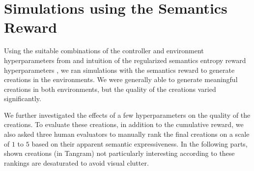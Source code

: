 \newpage
\section{Simulations using the Semantics Reward}
\label{sec:simulations}

Using the suitable combinations of the controller and environment hyperparameters from  and intuition of the regularized semantics entropy reward hyperparameters , we ran simulations with the semantics reward to generate creations in the environments.
We were generally able to generate meaningful creations in both environments, but the quality of the creations varied significantly.

We further investigated the effects of a few hyperparameters on the quality of the creations.
To evaluate these creations, in addition to the cumulative reward, we also asked three human evaluators to manually rank the final creations on a scale of \(1\) to \(5\) based on their apparent semantic expressiveness.
In the following parts, shown creations (in Tangram) not particularly interesting according to these rankings are desaturated to avoid visual clutter.


